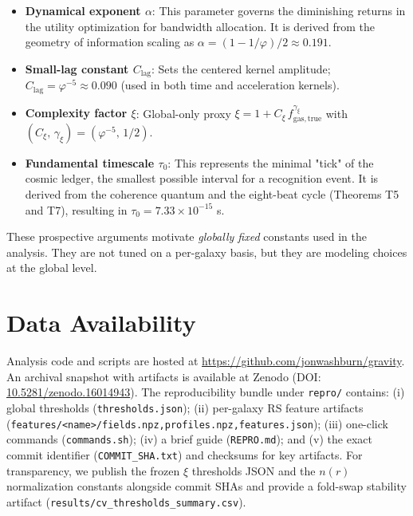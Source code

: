 \documentclass[fleqn,usenatbib]{mnras}
\begin{document}
\begin{itemize}
    \item \textbf{Dynamical exponent $\alpha$}: This parameter governs the diminishing returns in the utility optimization for bandwidth allocation. It is derived from the geometry of information scaling as $\alpha = (1-1/\varphi)/2 \approx 0.191$.
    
    \item \textbf{Small-lag constant $C_\mathrm{lag}$}: Sets the centered kernel amplitude; $C_\mathrm{lag} = \varphi^{-5} \approx 0.090$ (used in both time and acceleration kernels).
    
    \item \textbf{Complexity factor $\xi$}: Global-only proxy $\xi = 1 + C_\xi\, f_\mathrm{gas,true}^{\gamma_\xi}$ with $(C_\xi,\,\gamma_\xi) = (\varphi^{-5},\,1/2)$.
    
    \item \textbf{Fundamental timescale $\tau_0$}: This represents the minimal "tick" of the cosmic ledger, the smallest possible interval for a recognition event. It is derived from the coherence quantum and the eight-beat cycle (Theorems T5 and T7), resulting in $\tau_0 = 7.33 \times 10^{-15}$ s.
\end{itemize}

These prospective arguments motivate \emph{globally fixed} constants used in the analysis. They are not tuned on a per-galaxy basis, but they are modeling choices at the global level.

\section*{Data Availability}
\noindent
Analysis code and scripts are hosted at \href{https://github.com/jonwashburn/gravity}{https://github.com/jonwashburn/gravity}. An archival snapshot with artifacts is available at Zenodo (DOI: \href{https://doi.org/10.5281/zenodo.16014943}{10.5281/zenodo.16014943}). The reproducibility bundle under \texttt{repro/} contains: (i) global thresholds (\texttt{thresholds.json}); (ii) per-galaxy RS feature artifacts (\texttt{features/<name>/{fields.npz,profiles.npz,features.json}}); (iii) one-click commands (\texttt{commands.sh}); (iv) a brief guide (\texttt{REPRO.md}); and (v) the exact commit identifier (\texttt{COMMIT\_SHA.txt}) and checksums for key artifacts. For transparency, we publish the frozen $\xi$ thresholds JSON and the $n(r)$ normalization constants alongside commit SHAs and provide a fold-swap stability artifact (\texttt{results/cv\_thresholds\_summary.csv}).
\end{document}
